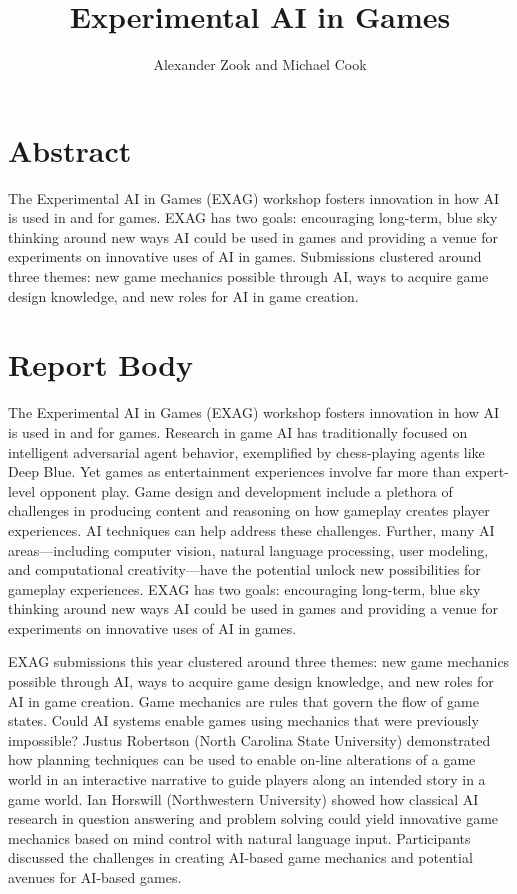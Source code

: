 \documentclass[10pt,a4paper]{article}
\author{Alexander Zook and Michael Cook}
\title{Experimental AI in Games}
\date{}
\begin{document}
\maketitle

\section*{Abstract}
The Experimental AI in Games (EXAG) workshop fosters innovation in how AI is used in and for games.
EXAG has two goals: encouraging long-term, blue sky thinking around new ways AI could be used in games and providing a venue for experiments on innovative uses of AI in games.
Submissions clustered around three themes: new game mechanics possible through AI, ways to acquire game design knowledge, and new roles for AI in game creation.



\section*{Report Body}

The Experimental AI in Games (EXAG) workshop fosters innovation in how AI is used in and for games.
Research in game AI has traditionally focused on intelligent adversarial agent behavior, exemplified by chess-playing agents like Deep Blue.
Yet games as entertainment experiences involve far more than expert-level opponent play.
Game design and development include a plethora of challenges in producing content and reasoning on how gameplay creates player experiences.
AI techniques can help address these challenges.
Further, many AI areas---including computer vision, natural language processing, user modeling, and computational creativity---have the potential unlock new possibilities for gameplay experiences.
EXAG has two goals: encouraging long-term, blue sky thinking around new ways AI could be used in games and providing a venue for experiments on innovative uses of AI in games.


EXAG submissions this year clustered around three themes: new game mechanics possible through AI, ways to acquire game design knowledge, and new roles for AI in game creation.
Game mechanics are rules that govern the flow of game states.
Could AI systems enable games using mechanics that were previously impossible?
Justus Robertson (North Carolina State University) demonstrated how planning techniques can be used to enable on-line alterations of a game world in an interactive narrative to guide players along an intended story in a game world.
Ian Horswill (Northwestern University) showed how classical AI research in question answering and problem solving could yield innovative game mechanics based on mind control with natural language input.
Participants discussed the challenges in creating AI-based game mechanics and potential avenues for AI-based games.
\end{document}

